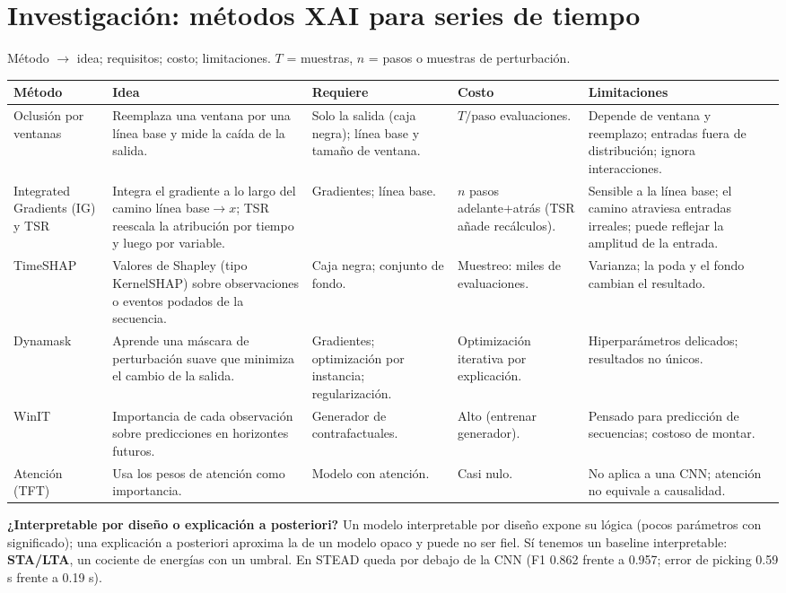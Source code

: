 \documentclass[10pt,letterpaper]{article}
\begin{document}
\section{Investigación: métodos XAI para series de tiempo}
Método $\to$ idea; requisitos; costo; limitaciones. $T$ = muestras, $n$ = pasos o muestras de perturbación.
\begin{table}[h]\centering\footnotesize
\begin{tabularx}{\textwidth}{>{\raggedright\arraybackslash}p{2.35cm}XX>{\raggedright\arraybackslash}p{2.1cm}X}
\toprule
Método & Idea & Requiere & Costo & Limitaciones\\\midrule
Oclusión por ventanas & Reemplaza una ventana por una línea base y mide la caída de la salida. & Solo la salida (caja negra); línea base y tamaño de ventana. & $T/\mathrm{paso}$ evaluaciones. & Depende de ventana y reemplazo; entradas fuera de distribución; ignora interacciones.\\
Integrated Gradients (IG) y TSR & Integra el gradiente a lo largo del camino línea base$\to x$; TSR reescala la atribución por tiempo y luego por variable. & Gradientes; línea base. & $n$ pasos adelante+atrás (TSR añade recálculos). & Sensible a la línea base; el camino atraviesa entradas irreales; puede reflejar la amplitud de la entrada.\\
TimeSHAP & Valores de Shapley (tipo KernelSHAP) sobre observaciones o eventos podados de la secuencia. & Caja negra; conjunto de fondo. & Muestreo: miles de evaluaciones. & Varianza; la poda y el fondo cambian el resultado.\\
Dynamask & Aprende una máscara de perturbación suave que minimiza el cambio de la salida. & Gradientes; optimización por instancia; regularización. & Optimización iterativa por explicación. & Hiperparámetros delicados; resultados no únicos.\\
WinIT & Importancia de cada observación sobre predicciones en horizontes futuros. & Generador de contrafactuales. & Alto (entrenar generador). & Pensado para predicción de secuencias; costoso de montar.\\
Atención (TFT) & Usa los pesos de atención como importancia. & Modelo con atención. & Casi nulo. & No aplica a una CNN; atención no equivale a causalidad.\\
\bottomrule
\end{tabularx}
\end{table}

\textbf{¿Interpretable por diseño o explicación a posteriori?} Un modelo interpretable por diseño expone su lógica
(pocos parámetros con significado); una explicación a posteriori aproxima la de un modelo opaco y puede no ser
fiel. Sí tenemos un baseline interpretable: \textbf{STA/LTA}, un cociente de energías con un umbral. En STEAD queda por
debajo de la CNN (F1 0.862 frente a 0.957; error de picking 0.59 s frente a 0.19 s).
\end{document}
